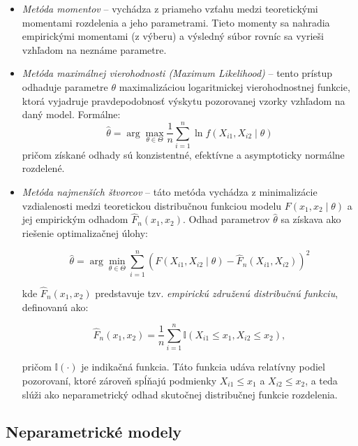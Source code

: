 \begin{itemize}
  \item \textit{Metóda momentov} – vychádza z priameho vzťahu medzi teoretickými momentami rozdelenia a jeho parametrami. Tieto momenty sa nahradia empirickými momentami (z výberu) a výsledný súbor rovníc sa vyrieši vzhľadom na neznáme parametre.

  \item \textit{Metóda maximálnej vierohodnosti (Maximum Likelihood)} – tento prístup odhaduje parametre $\theta$ maximalizáciou logaritmickej vierohodnostnej funkcie, ktorá vyjadruje pravdepodobnosť výskytu pozorovanej vzorky vzhľadom na daný model. Formálne:
  \begin{equation}
  \hat{\theta} = \arg\max_{\theta \in \Theta} \frac{1}{n} \sum_{i=1}^{n} \ln f(X_{i1}, X_{i2} \mid \theta)
  \end{equation}
  pričom získané odhady sú konzistentné, efektívne a asymptoticky normálne rozdelené.

  \item \textit{Metóda najmenších štvorcov} – táto metóda vychádza z minimalizácie vzdialenosti medzi teoretickou distribučnou funkciou modelu \(F(x_1, x_2 \mid \theta)\) a jej empirickým odhadom \(\hat{F}_n(x_1, x_2)\). Odhad parametrov \(\hat{\theta}\) sa získava ako riešenie optimalizačnej úlohy:

\begin{equation}
\hat{\theta} = \arg\min_{\theta \in \Theta} \sum_{i=1}^{n} \left( F(X_{i1}, X_{i2} \mid \theta) - \hat{F}_n(X_{i1}, X_{i2}) \right)^2
\end{equation}

kde \(\hat{F}_n(x_1, x_2)\) predstavuje tzv. \textit{empirickú združenú distribučnú funkciu}, definovanú ako:

\begin{equation}
\hat{F}_n(x_1, x_2) = \frac{1}{n} \sum_{i=1}^{n} \mathbb{I}(X_{i1} \leq x_1, X_{i2} \leq x_2),
\end{equation}

pričom \(\mathbb{I}(\cdot)\) je indikačná funkcia. Táto funkcia udáva relatívny podiel pozorovaní, ktoré zároveň spĺňajú podmienky \(X_{i1} \leq x_1\) a \(X_{i2} \leq x_2\), a teda slúži ako neparametrický odhad skutočnej distribučnej funkcie rozdelenia.
  
\end{itemize}

\subsection{Neparametrické modely}\label{subsec:joint_nonparam_models}

